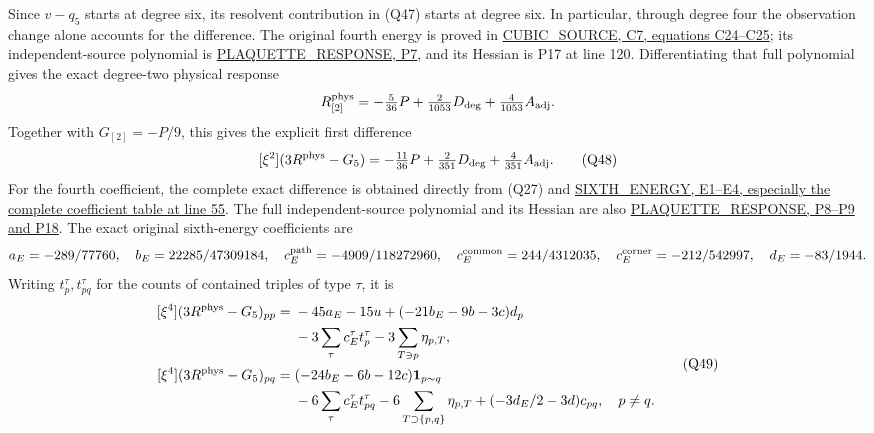 \documentclass[11pt]{article}
\begin{document}
Since \(v-q_5\) starts at degree six, its resolvent contribution in (Q47) starts at degree six. In particular, through degree four the observation change alone accounts for the difference. The original fourth energy is proved in \href{https://github.com/KokunoYumeto/yang-mills-interacting-workbench/blob/33a4c39de32c2c7fdf6f8ce796e40389f766669f/yang-mills/consolidation/20260921-fifth-reference/package/workbench/yang-mills/continuations/20260916-cubic-linearized/CUBIC_SOURCE.md#L214}{CUBIC\_SOURCE, C7, equations C24–C25}; its independent-source polynomial is \href{https://github.com/KokunoYumeto/yang-mills-interacting-workbench/blob/33a4c39de32c2c7fdf6f8ce796e40389f766669f/yang-mills/consolidation/20260921-fifth-reference/package/workbench/yang-mills/continuations/20260917-fifth-source/PLAQUETTE_RESPONSE.md#L47}{PLAQUETTE\_RESPONSE, P7}, and its Hessian is P17 at line 120. Differentiating that full polynomial gives the exact degree-two physical response
\[
 R^{\rm phys}_{[2]}
 =-\tfrac5{36}P+\tfrac2{1053}D_{\rm deg}
                   +\tfrac4{1053}A_{\rm adj}.
\]
Together with \(G_{[2]}=-P/9\), this gives the explicit first difference
\[
 [\xi^2](3R^{\rm phys}-G_5)
 =-\tfrac{11}{36}P+\tfrac2{351}D_{\rm deg}
                         +\tfrac4{351}A_{\rm adj}.
 \tag{Q48}
\]
For the fourth coefficient, the complete exact difference is obtained directly from (Q27) and \href{https://github.com/KokunoYumeto/yang-mills-interacting-workbench/blob/33a4c39de32c2c7fdf6f8ce796e40389f766669f/yang-mills/consolidation/20260921-fifth-reference/package/workbench/yang-mills/continuations/20260917-quartic-cube/SIXTH_ENERGY.md#L55}{SIXTH\_ENERGY, E1–E4, especially the complete coefficient table at line 55}. The full independent-source polynomial and its Hessian are also \href{https://github.com/KokunoYumeto/yang-mills-interacting-workbench/blob/33a4c39de32c2c7fdf6f8ce796e40389f766669f/yang-mills/consolidation/20260921-fifth-reference/package/workbench/yang-mills/continuations/20260917-fifth-source/PLAQUETTE_RESPONSE.md#L47}{PLAQUETTE\_RESPONSE, P8–P9 and P18}. The exact original sixth-energy coefficients are
\[
 a_E=-289/77760,\quad b_E=22285/47309184,\quad
 c_E^{\rm path}=-4909/118272960,\quad
 c_E^{\rm common}=244/4312035,\quad
 c_E^{\rm corner}=-212/542997,\quad d_E=-83/1944.
\]
Writing \(t_p^\tau,t_{pq}^\tau\) for the counts of contained triples of type \(\tau\), it is
\[
 \begin{aligned}\relax
 [\xi^4](3R^{\rm phys}-G_5)_{pp}
 ={}&-45a_E-15u
       +(-21b_E-9b-3c)d_p\\
 &-3\sum_\tau c_E^\tau t_p^\tau
       -3\sum_{T\ni p}\eta_{p,T},\\
 [\xi^4](3R^{\rm phys}-G_5)_{pq}
 ={}&(-24b_E-6b-12c)\mathbf1_{p\sim q}\\
 &-6\sum_\tau c_E^\tau t_{pq}^\tau
       -6\sum_{T\supset\{p,q\}}\eta_{p,T}
       +(-3d_E/2-3d)c_{pq},\quad p\ne q.
 \end{aligned}\tag{Q49}
\]
\end{document}
